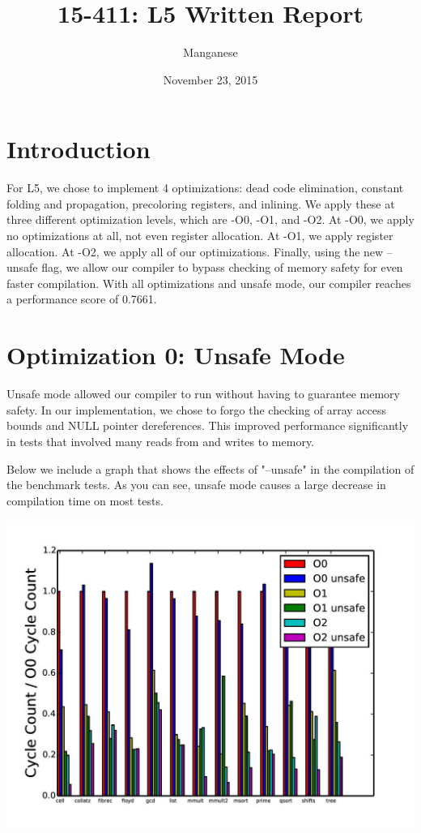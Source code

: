 \documentclass{article}
\title{15-411: L5 Written Report}
\author{Manganese}
\date{November 23, 2015}
\begin{document}
\maketitle

\section{Introduction}

For L5, we chose to implement 4 optimizations: dead code elimination, constant folding and propagation, precoloring registers, and inlining. We apply these at three different optimization levels, which are -O0, -O1, and -O2. At -O0, we apply no optimizations at all, not even register allocation. At -O1, we apply register allocation. At -O2, we apply all of our optimizations. Finally, using the new --unsafe flag, we allow our compiler to bypass checking of memory safety for even faster compilation. With all optimizations and unsafe mode, our compiler reaches a performance score of 0.7661.

\section{Optimization 0: Unsafe Mode}

Unsafe mode allowed our compiler to run without having to guarantee memory safety. In our implementation, we chose to forgo the checking of array access bounds and NULL pointer dereferences. This improved performance significantly in tests that involved many reads from and writes to memory. 

Below we include a graph that shows the effects of "--unsafe" in the compilation of the benchmark tests. As you can see, unsafe mode causes a large decrease in compilation time on most tests. 

\includegraphics[scale=0.5]{everything-page-001}
\end{document}
